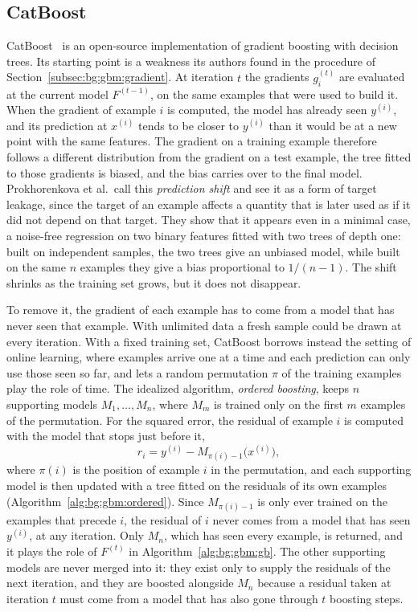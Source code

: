\subsection{CatBoost}
\label{subsec:bg:gbm:catboost}
CatBoost~\cite{prokhorenkova2018,dorogush2018} is an open-source
implementation of gradient boosting with decision trees. Its starting point is
a weakness its authors found in the procedure of
Section~\ref{subsec:bg:gbm:gradient}. At iteration $t$ the gradients
$g_i^{(t)}$ are evaluated at the current model $F^{(t-1)}$, on the same
examples that were used to build it. When the gradient of example $i$ is
computed, the model has already seen $y^{(i)}$, and its prediction at
$x^{(i)}$ tends to be closer to $y^{(i)}$ than it would be at a new point with
the same features. The gradient on a training example therefore follows a
different distribution from the gradient on a test example, the tree fitted to
those gradients is biased, and the bias carries over to the final
model. Prokhorenkova et al.\ call this
\emph{prediction shift} and see it as a form of target leakage, since the
target of an example affects a quantity that is later used as if it did not
depend on that target. They show that it appears even in a minimal case, a
noise-free regression on two binary features fitted with two trees of depth
one: built on independent samples, the two trees give an unbiased model,
while built on the same $n$ examples they give a bias proportional to
$1/(n-1)$. The shift shrinks as the training set
grows, but it does not disappear.

To remove it, the gradient of each example has to come from a model that has
never seen that example. With unlimited data a fresh sample could be drawn at
every iteration. With a fixed training set, CatBoost borrows instead the
setting of online learning, where examples arrive one at a time and each
prediction can only use those seen so far, and lets a random permutation $\pi$
of the training examples play the role of time. The idealized algorithm,
\emph{ordered boosting}, keeps $n$ supporting models $M_1, \dots, M_n$, where
$M_m$ is trained only on the first $m$ examples of the permutation. For the
squared error, the residual of example $i$ is computed with the model that
stops just before it,
\begin{equation}
r_i = y^{(i)} - M_{\pi(i) - 1}\bigl(x^{(i)}\bigr),
\label{eq:bg:gbm:ordered}
\end{equation}
where $\pi(i)$ is the position of example $i$ in the permutation, and each
supporting model is then updated with a tree fitted on the residuals of its
own examples (Algorithm~\ref{alg:bg:gbm:ordered}).
Since $M_{\pi(i)-1}$ is only ever trained on the examples that precede $i$,
the residual of $i$ never comes from a model that has seen $y^{(i)}$, at any
iteration. Only $M_n$, which has seen every example, is returned, and it plays
the role of $F^{(t)}$ in Algorithm~\ref{alg:bg:gbm:gb}. The other supporting
models are never merged into it: they exist only to supply the residuals of
the next iteration, and they are boosted alongside $M_n$ because a residual
taken at iteration $t$ must come from a model that has also gone through $t$
boosting steps.

